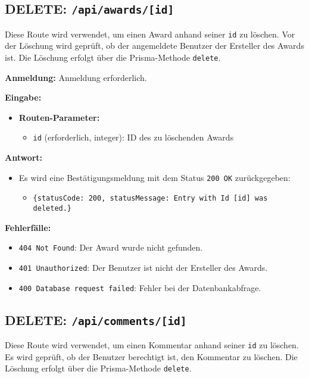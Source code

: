 \documentclass[a4paper,12pt]{article}
\begin{document}
\newpage
\subsection{DELETE: \texttt{/api/awards/[id]}}

Diese Route wird verwendet, um einen Award anhand seiner \texttt{id} zu
löschen. Vor der Löschung wird geprüft, ob der angemeldete Benutzer der
Ersteller des Awards ist. Die Löschung erfolgt über die Prisma-Methode
\texttt{delete}.

\textbf{Anmeldung:} Anmeldung erforderlich.

\textbf{Eingabe:}
\begin{itemize}
    \item \textbf{Routen-Parameter:}
    \begin{itemize}
        \item \texttt{id} (erforderlich, integer):
            ID des zu löschenden Awards
    \end{itemize}
\end{itemize}

\textbf{Antwort:}
\begin{itemize}
    \item Es wird eine Bestätigungsmeldung mit dem Status
        \texttt{200 OK} zurückgegeben:
    \begin{itemize}
        \item \texttt{\{statusCode: 200,
            statusMessage: Entry with Id [id] was deleted.\}}
    \end{itemize}
\end{itemize}

\textbf{Fehlerfälle:}
\begin{itemize}
    \item \texttt{404 Not Found}:
        Der Award wurde nicht gefunden.
    \item \texttt{401 Unauthorized}:
        Der Benutzer ist nicht der Ersteller des Awards.
    \item \texttt{400 Database request failed}:
        Fehler bei der Datenbankabfrage.
\end{itemize}

\newpage
\subsection{DELETE: \texttt{/api/comments/[id]}}

Diese Route wird verwendet, um einen Kommentar anhand seiner \texttt{id} zu
löschen. Es wird geprüft, ob der Benutzer berechtigt ist, den Kommentar zu
löschen. Die Löschung erfolgt über die Prisma-Methode \texttt{delete}.
\end{document}

